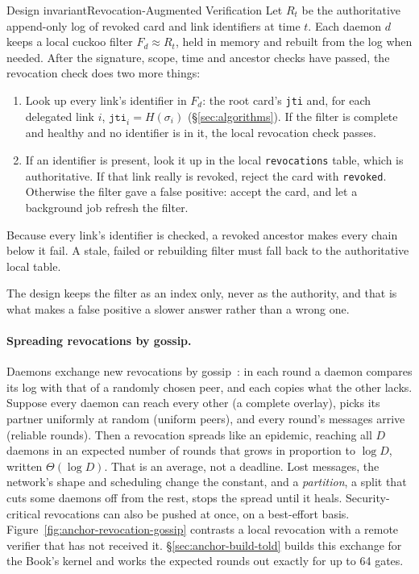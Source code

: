 \documentclass[11pt,a4paper]{article}
\theoremstyle{definition}
\begin{document}
\begin{pdclaim}{Design invariant}{Revocation-Augmented Verification}
\setlength{\parskip}{4pt plus 1pt}
\label{def:revocation}
Let $R_t$ be the authoritative append-only log of revoked card and link identifiers at time $t$. Each daemon $d$ keeps a local cuckoo filter $F_d \approx R_t$, held in memory and rebuilt from the log when needed. After the signature, scope, time and ancestor checks have passed, the revocation check does two more things:
\begin{enumerate}[nosep]
  \item Look up every link's identifier in $F_d$: the root card's \texttt{jti}
  and, for each delegated link $i$, $\texttt{jti}_i = H(\sigma_i)$
  (\S\ref{sec:algorithms}). If the filter is complete and healthy and no
  identifier is in it, the local revocation check passes.
  \item If an identifier is present, look it up in the local \texttt{revocations} table, which is authoritative. If that link really is revoked, reject the card with \texttt{revoked}. Otherwise the \mbox{filter} gave a false positive: accept the card, and let a background job refresh the filter.
\end{enumerate}

Because every link's identifier is checked, a revoked ancestor makes every
chain below it fail. A stale, failed or rebuilding filter must fall back to
the authoritative local table.

The design keeps the filter as an index only, never as the authority, and that is what makes a false positive a slower answer rather than a wrong one.
\end{pdclaim}

\paragraph{Spreading revocations by gossip.} Daemons exchange new revocations by  gossip~: in each round a daemon compares its log with that of a randomly chosen peer, and each copies what the other lacks. Suppose every daemon can reach every other (a complete overlay), picks its partner uniformly at random (uniform peers), and every round's messages arrive (reliable rounds). Then a revocation spreads like an epidemic, reaching all $D$ daemons in an expected number of rounds that grows in proportion to $\log D$, written $\Theta(\log D)$. That is an average, not a deadline. Lost messages, the network's shape and scheduling change the constant, and a \emph{partition}, a split that cuts some daemons off from the rest, stops the spread until it heals. Security-critical revocations can also be pushed at once, on a best-effort basis. Figure~\ref{fig:anchor-revocation-gossip} contrasts a local revocation with a remote verifier that has not received it. \S\ref{sec:anchor-build-told} builds this exchange for the Book's kernel and works the expected rounds out exactly for up to 64 gates.
\end{document}
